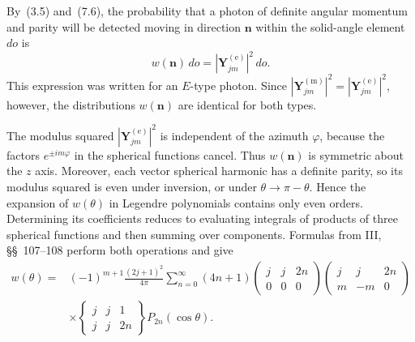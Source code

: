 By~(3.5) and~(7.6), the probability that a photon of definite angular momentum and parity will be detected moving in direction $\mathbf n$ within the solid-angle element $do$ is
\begin{equation}
w(\mathbf n)\,do=|\mathbf Y^{(\text{e})}_{jm}|^2\,do.
\tag{7.11}
\end{equation}
This expression was written for an $E$-type photon. Since $|\mathbf Y^{(\text{m})}_{jm}|^2=|\mathbf Y^{(\text{e})}_{jm}|^2$, however, the distributions $w(\mathbf n)$ are identical for both types.

The modulus squared $|\mathbf Y^{(\text{e})}_{jm}|^2$ is independent of the azimuth $\varphi$, because the factors $e^{\pm im\varphi}$ in the spherical functions cancel. Thus $w(\mathbf n)$ is symmetric about the $z$ axis. Moreover, each vector spherical harmonic has a definite parity, so its modulus squared is even under inversion, or under $\theta\to\pi-\theta$. Hence the expansion of $w(\theta)$ in Legendre polynomials contains only even orders. Determining its coefficients reduces to evaluating integrals of products of three spherical functions and then summing over components. Formulas from III, \S\S~107--108 perform both operations and give
\begin{equation}
\begin{aligned}
w(\theta)={}&(-1)^{m+1}\frac{(2j+1)^2}{4\pi}
\sum_{n=0}^{\infty}(4n+1)
\begin{pmatrix}j&j&2n\\0&0&0\end{pmatrix}
\begin{pmatrix}j&j&2n\\m&-m&0\end{pmatrix}\\
&\times
\begin{Bmatrix}j&j&1\\j&j&2n\end{Bmatrix}
P_{2n}(\cos\theta).
\end{aligned}
\tag{7.12}
\end{equation}

